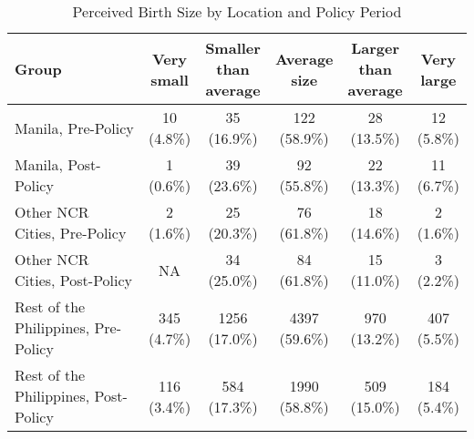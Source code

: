 \begin{table}[!h]
\centering
\caption{Perceived Birth Size by Location and Policy Period}
\centering
\begin{tabular}[t]{lccccc}
\toprule
Group & \makecell{Very\\small} & \makecell{Smaller\\than\\average} & \makecell{Average\\size} & \makecell{Larger\\than\\average} & \makecell{Very\\large}\\
\midrule
Manila, Pre-Policy & \makecell{10 \\ (4.8\%)} & \makecell{35 \\ (16.9\%)} & \makecell{122 \\ (58.9\%)} & \makecell{28 \\ (13.5\%)} & \makecell{12 \\ (5.8\%)}\\
Manila, Post-Policy & \makecell{1 \\ (0.6\%)} & \makecell{39 \\ (23.6\%)} & \makecell{92 \\ (55.8\%)} & \makecell{22 \\ (13.3\%)} & \makecell{11 \\ (6.7\%)}\\
Other NCR Cities, Pre-Policy & \makecell{2 \\ (1.6\%)} & \makecell{25 \\ (20.3\%)} & \makecell{76 \\ (61.8\%)} & \makecell{18 \\ (14.6\%)} & \makecell{2 \\ (1.6\%)}\\
Other NCR Cities, Post-Policy & NA & \makecell{34 \\ (25.0\%)} & \makecell{84 \\ (61.8\%)} & \makecell{15 \\ (11.0\%)} & \makecell{3 \\ (2.2\%)}\\
Rest of the Philippines, Pre-Policy & \makecell{345 \\ (4.7\%)} & \makecell{1256 \\ (17.0\%)} & \makecell{4397 \\ (59.6\%)} & \makecell{970 \\ (13.2\%)} & \makecell{407 \\ (5.5\%)}\\
Rest of the Philippines, Post-Policy & \makecell{116 \\ (3.4\%)} & \makecell{584 \\ (17.3\%)} & \makecell{1990 \\ (58.8\%)} & \makecell{509 \\ (15.0\%)} & \makecell{184 \\ (5.4\%)}\\
\bottomrule
\end{tabular}
\end{table}
